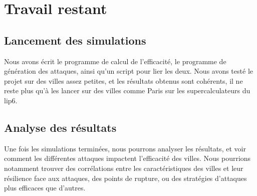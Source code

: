 \section{Travail restant}
\subsection{Lancement des simulations}
Nous avons écrit le programme de calcul de l'efficacité, le programme de génération des attaques, ainsi qu'un script pour lier les deux.
Nous avons testé le projet sur des villes assez petites, et les résultats obtenus sont cohérents, il ne reste plus qu'à les lancer sur des villes comme Paris sur les supercalculateurs du lip6.
\subsection{Analyse des résultats}
Une fois les simulations terminées, nous pourrons analyser les résultats, et voir comment les différentes attaques impactent l'efficacité des villes.
Nous pourrions notamment trouver des corrélations entre les caractéristiques des villes et leur résilience face aux attaques, des points de rupture, ou des stratégies d'attaques plus efficaces que d'autres.
